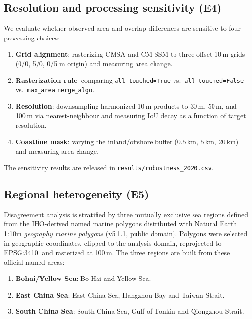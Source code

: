 \documentclass[11pt]{article}
\begin{document}
\subsection{Resolution and processing sensitivity (E4)}

We evaluate whether observed area and overlap differences are sensitive to
four processing choices:

\begin{enumerate}[nosep]
\item \textbf{Grid alignment}: rasterizing CMSA and CM-SSM to three offset 10\,m
  grids (0/0, 5/0, 0/5 m origin) and measuring area change.
\item \textbf{Rasterization rule}: comparing \texttt{all\_touched=True} vs.\
  \texttt{all\_touched=False} vs.\ \texttt{max\_area} \texttt{merge\_algo}.
\item \textbf{Resolution}: downsampling harmonized 10\,m products to 30\,m,
  50\,m, and 100\,m via nearest-neighbour and measuring IoU decay as a
  function of target resolution.
\item \textbf{Coastline mask}: varying the inland/offshore buffer (0.5\,km,
  5\,km, 20\,km) and measuring area change.
\end{enumerate}

The sensitivity results are released in
\texttt{results/robustness\_2020.csv}.

\subsection{Regional heterogeneity (E5)}
\label{sec:methods-e5}

Disagreement analysis is stratified by three mutually exclusive sea regions
defined from the IHO-derived named marine polygons distributed with Natural
Earth 1:10m \emph{geography marine polygons} (v5.1.1, public domain). Polygons
were selected in geographic coordinates, clipped to the analysis domain,
reprojected to EPSG:3410, and rasterized at 100\,m. The three regions are
built from these official named areas:

\begin{enumerate}[nosep]
\item \textbf{Bohai/Yellow Sea}: Bo Hai and Yellow Sea.
\item \textbf{East China Sea}: East China Sea, Hangzhou Bay and Taiwan Strait.
\item \textbf{South China Sea}: South China Sea, Gulf of Tonkin and Qiongzhou
  Strait.
\end{enumerate}
\end{document}
